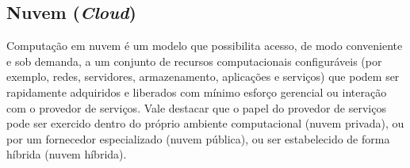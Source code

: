 \subsection{Nuvem (\emph{Cloud})}
\label{sub-cloud}

    Computação em nuvem é um modelo que possibilita acesso, de modo conveniente e sob demanda, a um conjunto de recursos computacionais configuráveis (por exemplo, redes, servidores, armazenamento, aplicações e serviços) que podem ser rapidamente adquiridos e liberados com mínimo esforço gerencial ou interação com o provedor de serviços. Vale destacar que o papel do provedor de serviços pode ser exercido dentro do próprio ambiente computacional (nuvem privada), ou por um fornecedor especializado (nuvem pública), ou ser estabelecido de forma híbrida (nuvem híbrida).
    
